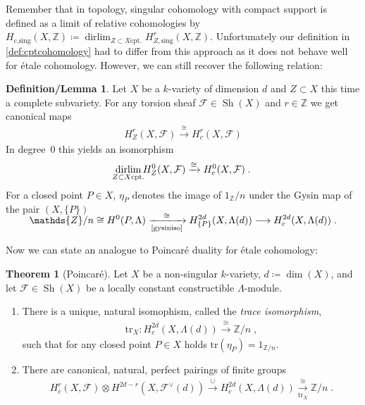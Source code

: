\documentclass[english]{scrartcl}
\theoremstyle{definition}
\newtheorem{DefLem}[Def]{Definition/Lemma}
\newtheorem{Thm}[Def]{Theorem}
\theoremstyle{remark}
\newcommand*{\Z}{\mathds{Z}}
\newcommand*{\Zmod}[1]{\Z/#1} %
\newcommand*{\F}{\mathcal{F}} %
\DeclareMathOperator*{\dirlim}{dirlim} %
\DeclareMathOperator{\Sh}{Sh} %
\newcommand*{\Tr}{\text{tr}} %
\newcommand*{\tr}[1]{\Tr\left(#1\right)} %
\begin{document}
Remember that in topology, singular cohomology with compact support is
defined as a limit of relative cohomologies by
$H_{\text{c,sing}}(X,\Z)\coloneqq
\dirlim_{Z\subset X \text{cpt.}}H_{Z,\text{sing}}^r(X,\Z)$.
Unfortunately our definition in \ref{def:cptcohomology} had to differ from
this approach as it does not behave well for étale cohomology.
However, we can still recover the following relation:
\begin{DefLem}\label{def:etapoint}
  Let $X$ be a $k$-variety of dimension $d$ and $Z\subset X$ this time
  a complete subvariety. For any torsion sheaf $\F\in\Sh(X)$ and
  $r\in\Z$ we get canonical maps
  \begin{gather*}
    H_Z^r(X,\F)\xrightarrow{\cong} H_c^r(X,\F)
  \end{gather*}
  In degree~0 this yields an isomorphism
  \begin{gather*}
    \dirlim_{\mathclap{Z\subset X \text{cpt.}}} H_Z^0(X,\F) 
    \xrightarrow{\cong} H_c^0(X,\F)\;.
  \end{gather*}
  For a closed point $P\in X$, $\eta_P$ denotes the image of
  $1_\Zmod{n}$ under the Gysin map of the pair $(X,\{P\})$
  \begin{gather*}
    \SwapAboveDisplaySkip
    \Zmod{n}
    \cong H^0(P,\Lambda)
    \xrightarrow[\text{\ref{gysiniso}}]{\cong}
    H_{\{P\}}^{2d}(X,\Lambda(d))
    \longrightarrow H_c^{2d}(X,\Lambda(d))\;.
  \end{gather*}
\end{DefLem}

Now we can state an analogue to Poincaré duality for étale cohomology:
\begin{Thm}[Poincaré]\label{poincare}
  Let $X$ be a non-singular $k$-variety,
  $d\coloneqq\dim(X)$,
  and let $\F\in\Sh(X)$ be a locally constant constructible
  $\Lambda$-module.
  \begin{enumerate}
  \item There is a unique, natural isomophism,
    called the \emph{trace isomorphism},
    \begin{gather*}
      \Tr_X\colon H_c^{2d}(X,\Lambda(d)) \xrightarrow{\cong} \Zmod{n}
      \;,
    \end{gather*}
    such that for any closed point $P\in X$ holds
    $\tr{\eta_P}=1_{\Zmod{n}}$.
  \item There are canonical, natural, perfect pairings of finite groups
    \begin{gather*}
      H_c^r(X,\F) \otimes H^{2d-r}\left(X,\F^\vee(d)\right)
      \overset\cup\longrightarrow H_c^{2d}(X,\Lambda(d))
      \xrightarrow[\Tr_X]{\cong} \Zmod{n}
      \;.
    \end{gather*}
  \end{enumerate}
\end{Thm}
\end{document}
